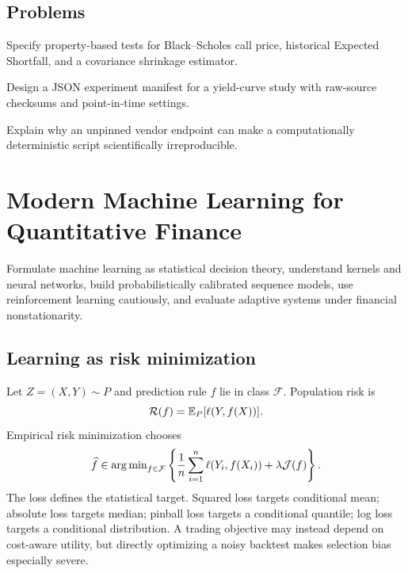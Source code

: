 \section{Problems}

\begin{exercise}
Specify property-based tests for Black--Scholes call price, historical Expected
Shortfall, and a covariance shrinkage estimator.
\end{exercise}
\begin{exercise}
Design a JSON experiment manifest for a yield-curve study with raw-source checksums
and point-in-time settings.
\end{exercise}
\begin{exercise}
Explain why an unpinned vendor endpoint can make a computationally deterministic
script scientifically irreproducible.
\end{exercise}


\chapter{Modern Machine Learning for Quantitative Finance}

\begin{objectives}
Formulate machine learning as statistical decision theory, understand kernels and
neural networks, build probabilistically calibrated sequence models, use
reinforcement learning cautiously, and evaluate adaptive systems under financial
nonstationarity.
\end{objectives}

\section{Learning as risk minimization}

Let $Z=(X,Y)\sim P$ and prediction rule $f$ lie in class $\mathcal F$. Population
risk is
\[
\mathcal R(f)=\operatorname{\mathbb E}_P[\ell(Y,f(X))].
\]
Empirical risk minimization chooses
\[
\widehat f\in\operatorname{arg\,min}_{f\in\mathcal F}
\left\{\frac1n\sum_{i=1}^n\ell(Y_i,f(X_i))
+\lambda\mathcal J(f)\right\}.
\]
The loss defines the statistical target. Squared loss targets conditional mean;
absolute loss targets median; pinball loss targets a conditional quantile; log loss
targets a conditional distribution. A trading objective may instead depend on
cost-aware utility, but directly optimizing a noisy backtest makes selection bias
especially severe.

